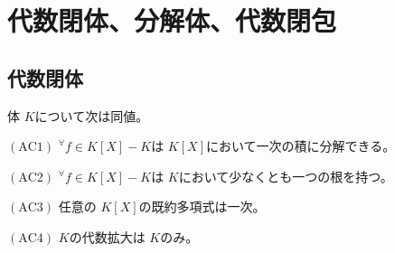 \documentclass[../master_galois_theory]{subfiles}
\begin{document}
\setcounter{section}{6}

\section{代数閉体、分解体、代数閉包}

\subsection{代数閉体}

\begin{prop}
  体 $K$について次は同値。

  $(\mathrm{AC}1)$
    ${}^\forall f \in K[X] - K$は $K[X]$において一次の積に分解できる。

  $(\mathrm{AC}2)$
    ${}^\forall f \in K[X] - K$は $K$において少なくとも一つの根を持つ。

  $(\mathrm{AC}3)$
    任意の $K[X]$の既約多項式は一次。

  $(\mathrm{AC}4)$
    $K$の代数拡大は $K$のみ。
\end{prop}
\end{document}
